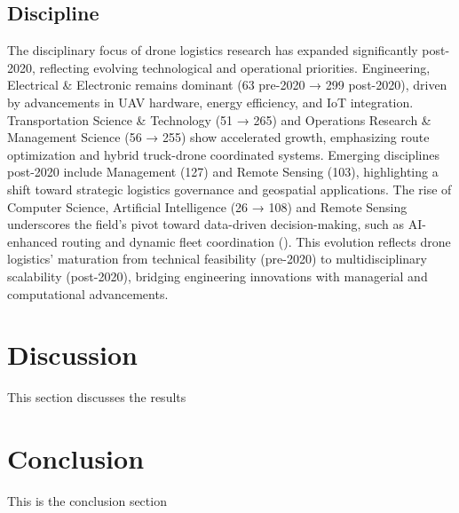\documentclass{article}
\begin{document}
\subsection{Discipline}
The disciplinary focus of drone logistics research has expanded significantly post-2020, reflecting evolving technological and operational priorities. Engineering, Electrical \& Electronic remains dominant (63 pre-2020 → 299 post-2020), driven by advancements in UAV hardware, energy efficiency, and IoT integration. Transportation Science \& Technology (51 → 265) and Operations Research \& Management Science (56 → 255) show accelerated growth, emphasizing route optimization and hybrid truck-drone coordinated systems. Emerging disciplines post-2020 include Management (127) and Remote Sensing (103), highlighting a shift toward strategic logistics governance and geospatial applications. The rise of Computer Science, Artificial Intelligence (26 → 108) and Remote Sensing underscores the field’s pivot toward data-driven decision-making, such as AI-enhanced routing and dynamic fleet coordination (\cite{WOS:000742554100008}). This evolution reflects drone logistics' maturation from technical feasibility (pre-2020) to multidisciplinary scalability (post-2020), bridging engineering innovations with managerial and computational advancements.



\section{Discussion}
This section discusses the results

\section{Conclusion}
This is the conclusion section

\printbibliography
\end{document}
